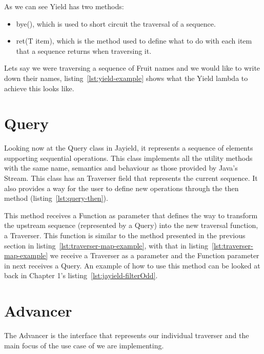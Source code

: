 As we can see Yield has two methods:
\begin{itemize}
\item bye(), which is used to short circuit the traversal of a sequence.
\item ret(T item), which is the method used to define what to do with each item that a sequence returns when traversing it.
\end{itemize}

Lets say we were traversing a sequence of Fruit names and we would like to write down their names, listing~\ref{lst:yield-example} shows what the Yield lambda to achieve this looks like.




\section{Query}

Looking now at the Query class in Jayield, it represents a sequence of elements supporting sequential operations. This class implements all the utility methods with the same name, semantics and behaviour as those provided by Java's Stream. This class has an Traverser field that represents the current sequence. It also provides a way for the user to define new operations through the then method (listing~\ref{lst:query-then}).



 This method receives a Function as parameter that defines the way to transform the upstream sequence (represented by a Query) into the new traversal function, a Traverser. This function is similar to the method presented in the previous section in listing~\ref{lst:traverser-map-example}, with that in listing~\ref{lst:traverser-map-example} we receive a Traverser as a parameter and the Function parameter in next receives a Query. An example of how to use this method can be looked at back in Chapter 1's listing~\ref{lst:jayield-filterOdd}.

\section{Advancer}

The Advancer is the interface that represents our individual traverser and the main focus of the use case of we are implementing.

